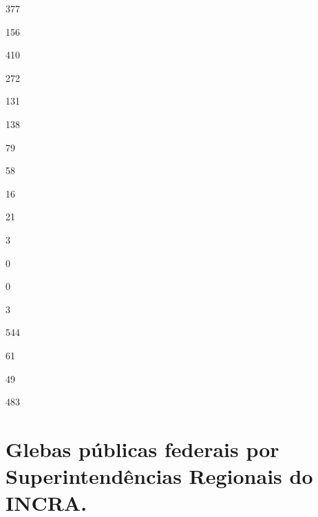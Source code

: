 \documentclass[
  letterpaper,
]{report}
\begin{document}
377

\n      

156

\n    

\n    

\n      

410

\n      

272

\n      

131

\n      

138

\n    

\n    

\n      

79

\n      

58

\n      

16

\n      

21

\n    

\n    

\n      

3

\n      

0

\n      

0

\n      

3

\n    

\n    

\n      

544

\n      

61

\n      

49

\n      

483

\n    

\n  

\n


\hypertarget{glebas-puxfablicas-federais-por-superintenduxeancias-regionais-do-incra.}{%
\chapter{Glebas públicas federais por Superintendências Regionais do
INCRA.}\label{glebas-puxfablicas-federais-por-superintenduxeancias-regionais-do-incra.}}
\end{document}
